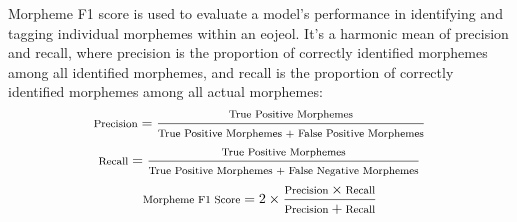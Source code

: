\documentclass[AMS,STIX2COL]{WileyNJD-v2}
\begin{document}
    Morpheme F1 score is used to evaluate a model's performance in identifying and tagging individual morphemes within an eojeol.
    It's a harmonic mean of precision and recall, where precision is the proportion of correctly identified morphemes among all identified morphemes, and recall is the proportion of correctly identified morphemes among all actual morphemes:
    \vspace{1mm}
    \[
        \footnotesize
        \text{Precision} = \frac{\text{True Positive Morphemes}}{\text{True Positive Morphemes + False Positive Morphemes}}
    \]
    \vspace{1mm}
    \[
        \footnotesize
        \text{Recall} = \frac{\text{True Positive Morphemes}}{\text{True Positive Morphemes + False Negative Morphemes}}
    \]
    \vspace{1mm}
    \[
        \footnotesize
        \text{Morpheme F1 Score} = 2 \times \frac{\text{Precision} \times \text{Recall}}{\text{Precision} + \text{Recall}}
    \]
    \vspace{0.5mm}
\end{document}

